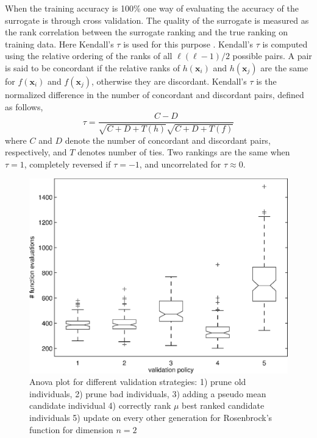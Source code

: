\documentclass[10pt, conference]{IEEEtran} %
\renewcommand{\vec}[1]{\mathbf{#1}}
\begin{document}
When the training accuracy is 100\% one way of evaluating the accuracy of the surrogate is through cross validation. The quality of the surrogate is measured as the rank correlation between the surrogate ranking and the true ranking on training data. Here Kendall's $\tau$ is used for this purpose \cite{kendalltau}.  Kendall's $\tau$ is computed using the relative ordering of the ranks of all $\ell(\ell-1)/2$ possible pairs.  A pair is said to be concordant if the relative ranks of $h(\vec{x}_i)$ and $h(\vec{x}_j)$ are the same for $f(\vec{x}_i)$ and $f(\vec{x}_j)$, otherwise they are discordant. Kendall's $\tau$ is the normalized difference in the number of concordant and discordant pairs, defined as follows, %
\begin{equation}
\tau = \frac{C-D}{\sqrt{C+D+T(h)}\sqrt{C+D+T(f)}}
\end{equation}
where $C$ and $D$ denote the number of concordant and discordant pairs, respectively, and $T$ denotes number of ties. %
Two rankings are the same when $\tau=1$, completely reversed if $\tau = -1$, and uncorrelated for $\tau \approx 0$.

\begin{figure}[b!]
\centering
\includegraphics[width=0.80\columnwidth]{anova}
\caption{Anova plot for different validation strategies: 1) prune old individuals, 2) prune bad individuals, 3) adding a pseudo mean candidate individual 
4) correctly rank $\mu$ best ranked candidate individuals 5) update on every other generation for Rosenbrock's function for dimension $n=2$}
\label{fig:anova}
\end{figure}
\end{document}
